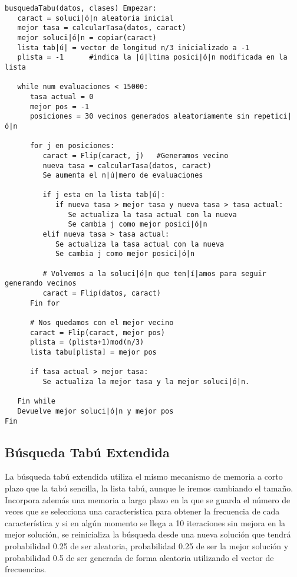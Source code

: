 \documentclass[12pt]{article}
\begin{document}
\begin{lstlisting}
busquedaTabu(datos, clases) Empezar:
   caract = soluci|ó|n aleatoria inicial
   mejor tasa = calcularTasa(datos, caract)
   mejor soluci|ó|n = copiar(caract)
   lista tab|ú| = vector de longitud n/3 inicializado a -1
   plista = -1		#indica la |ú|ltima posici|ó|n modificada en la lista

   while num evaluaciones < 15000:
      tasa actual = 0
      mejor pos = -1
      posiciones = 30 vecinos generados aleatoriamente sin repetici|ó|n
      
      for j en posiciones:
         caract = Flip(caract, j) 	#Generamos vecino
         nueva tasa = calcularTasa(datos, caract)
         Se aumenta el n|ú|mero de evaluaciones
         
         if j esta en la lista tab|ú|:
            if nueva tasa > mejor tasa y nueva tasa > tasa actual:
               Se actualiza la tasa actual con la nueva
               Se cambia j como mejor posici|ó|n
         elif nueva tasa > tasa actual:
            Se actualiza la tasa actual con la nueva
            Se cambia j como mejor posici|ó|n
            
         # Volvemos a la soluci|ó|n que ten|í|amos para seguir generando vecinos
         caract = Flip(datos, caract)
      Fin for
      
      # Nos quedamos con el mejor vecino
      caract = Flip(caract, mejor pos)
      plista = (plista+1)mod(n/3)
      lista tabu[plista] = mejor pos
   
      if tasa actual > mejor tasa:
         Se actualiza la mejor tasa y la mejor soluci|ó|n.

   Fin while
   Devuelve mejor soluci|ó|n y mejor pos
Fin

\end{lstlisting}



\subsection{Búsqueda Tabú Extendida}
La búsqueda tabú extendida utiliza el mismo mecanismo de memoria a corto plazo que la tabú sencilla, la lista tabú, aunque le iremos cambiando el tamaño. Incorpora además una memoria a largo plazo en la que se guarda el número de veces que se selecciona una característica para obtener la frecuencia de cada característica y si en algún momento se llega a 10 iteraciones sin mejora en la mejor solución, se reinicializa la búsqueda desde una nueva solución que tendrá probabilidad 0.25 de ser aleatoria, probabilidad 0.25 de ser la mejor solución y probabilidad 0.5 de ser generada de forma aleatoria utilizando el vector de frecuencias.\\
\end{document}
